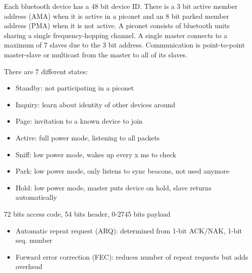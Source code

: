 \begin{mytitle}[Baseband]
    \begin{mysubtitle}[Addressing] Each bluetooth device has a 48 bit device ID. There is a 3 bit active member address (AMA) when it is active in a piconet and an 8 bit parked member address (PMA) when it is not active. A piconet consists of bluetooth units sharing a single frequency-hopping channel. A single master connects to a maximum of 7 slaves due to the 3 bit address. Communication is point-to-point master-slave or multicast from the master to all of its slaves.
    \end{mysubtitle}
    \begin{mysubtitle} There are 7 different states:
    \begin{itemize}
        \item Standby: not participating in a piconet
        \item Inquiry: learn about identity of other devices around
        \item Page: invitation to a known device to join
        \item Active: full power mode, listening to all packets
        \item Sniff: low power mode, wakes up every x ms to check
        \item Park: low power mode, only listens to sync beacons, not used anymore
        \item Hold: low power mode, master puts device on hold, slave returns automatically
    \end{itemize}
    \end{mysubtitle}
    \begin{mysubtitle} 72 bits access code, 54 bits header, 0-2745 bits payload
    \end{mysubtitle}
    \begin{mysubtitle}\hfill
    \begin{itemize}
        \item Automatic repeat request (ARQ): determined from 1-bit ACK/NAK, 1-bit seq. number
        \item Forward error correction (FEC): reduces number of repeat requests but adds overhead
    \end{itemize}
    \end{mysubtitle}
\end{mytitle}


